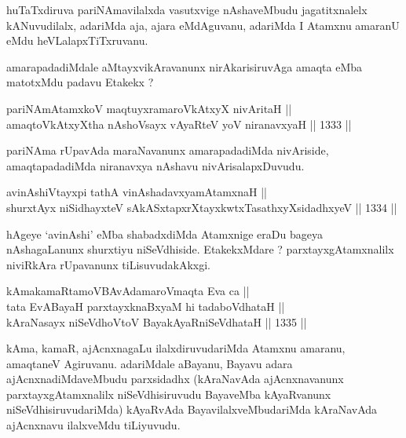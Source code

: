 \begin{artha}
huTaTxdiruva pariNAmavilalxda vasutxvige nAshaveMbudu jagatitxnalelx kANuvudilalx, adariMda aja, ajara eMdAguvanu, adariMda I Atamxnu amaranU eMdu heVLalapxTiTxruvanu.
\end{artha}

\begin{artha}
amarapadadiMdale aMtayxvikAravanunx nirAkarisiruvAga amaqta eMba matotxMdu padavu Etakekx ?
\end{artha}

\begin{shl}
pariNAmAtamxkoV maqtuyxramaroVkAtxyX nivAritaH || \\
amaqtoVkAtxyX\s tha nAshoV\s sayx vAyaRteV yoV niranavxyaH \hfill || 1333 ||  
\end{shl}

\begin{artha}
pariNAma rUpavAda maraNavanunx amarapadadiMda nivAriside, amaqtapadadiMda niranavxya nAshavu nivArisalapxDuvudu.
\end{artha}

\begin{shl}
avinAshiVtayxpi tathA vinAshadavxyamAtamxnaH || \\
shurxtAyx niSidhayxteV sAkASxtapxrXtayxkwtxTasathxyXsidadhxyeV \hfill || 1334 ||  
\end{shl}

\begin{artha}
hAgeye `avinAshi' eMba shabadxdiMda Atamxnige eraDu bageya nAshagaLanunx shurxtiyu niSeVdhiside. EtakekxMdare ? parxtayxgAtamxnalilx niviRkAra rUpavanunx tiLisuvudakAkxgi.
\end{artha}

\begin{shl}
kAmakamaRtamoVBAvAdamaroV\s maqta Eva ca || \\
tata EvABayaH parxtayxknaBxyaM hi tadaboVdhataH || \\
kAraNasayx niSeVdhoV\s toV BayakAyaRniSeVdhataH \hfill || 1335 ||  
\end{shl}

\begin{artha}
kAma, kamaR, ajAcnxnagaLu ilalxdiruvudariMda Atamxnu amaranu, amaqtaneV Agiruvanu. adariMdale aBayanu, Bayavu adara ajAcnxnadiMdaveMbudu parxsidadhx (kAraNavAda ajAcnxnavanunx parxtayxgAtamxnalilx niSeVdhisiruvudu BayaveMba kAyaRvanunx niSeVdhisiruvudariMda) kAyaRvAda BayavilalxveMbudariMda kAraNavAda ajAcnxnavu ilalxveMdu tiLiyuvudu.
\end{artha}


